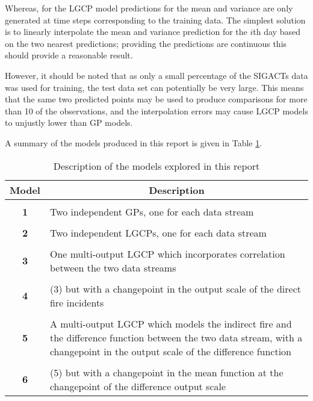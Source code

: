 \documentclass[a4paper,11pt]{report}
\begin{document}
Whereas, for the LGCP model predictions for the mean and variance are only generated at time steps corresponding to the training data. The simplest solution is to linearly interpolate the mean and variance prediction for the \(i\)th day based on the two nearest predictions; providing the predictions are continuous this should provide a reasonable result. \par

However, it should be noted that as only a small percentage of the SIGACTs data was used for training, the test data set can potentially be very large. This means that the same two predicted points may be used to produce comparisons for more than 10 of the observations, and the interpolation errors may cause LGCP models to unjustly lower than GP models. \par

A summary of the models produced in this report is given in Table \ref{tab:model-description}.

\begin{table}[]
\caption{Description of the models explored in this report}
\label{tab:model-description}
\centering
\begin{tabular}{c|p{14cm}}
\textbf{Model} & \multicolumn{1}{c}{\textbf{Description}}                                                                                                                                                          \\ \hline
& \\
\bf{1}              & Two independent GPs, one for each data stream                                                                                                                                 \\
& \\
\bf{2}              & Two independent LGCPs, one for each data stream                                                                                                                               \\
& \\
\bf{3}              & One multi-output LGCP which incorporates correlation between the two data streams                                                                                             \\
& \\
\bf{4}              & (3) but with a changepoint in the output scale of the direct fire incidents                                                                                                   \\
& \\
\bf{5}              & A multi-output LGCP which models the indirect fire and the difference function between the two data stream, with a changepoint in the output scale of the difference function \\
& \\
\bf{6}              & (5) but with a changepoint in the mean function at the changepoint of the difference output scale                                                                            
\end{tabular}
\end{table}
\end{document}
